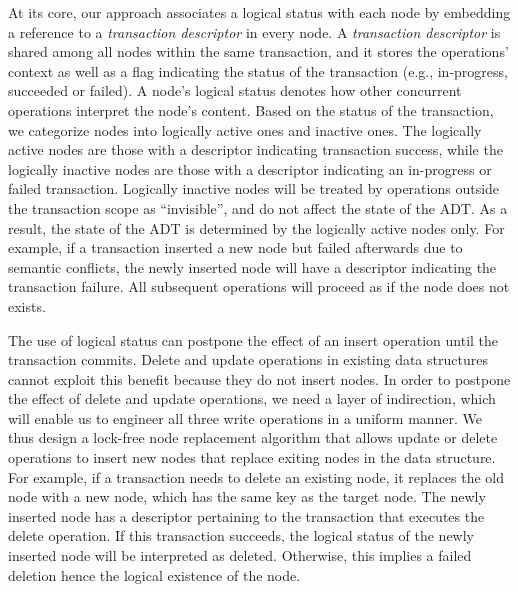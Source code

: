 \documentclass[10pt,conference,compsocconf]{IEEEtran}
\begin{document}
At its core, our approach associates a logical status with each node by embedding a reference to a \emph{transaction descriptor} in every node.
A \emph{transaction descriptor} is shared among all nodes within the same transaction, and it stores the operations' context as well as a flag indicating the status of the transaction (e.g., in-progress, succeeded or failed).
A node's logical status denotes how other concurrent operations interpret the node's content.
Based on the status of the transaction, we categorize nodes into logically active ones and inactive ones.
The logically active nodes are those with a descriptor indicating transaction success, while the logically inactive nodes are those with a descriptor indicating an in-progress or failed transaction.
Logically inactive nodes will be treated by operations outside the transaction scope as ``invisible'', and do not affect the state of the ADT. 
As a result, the state of the ADT is determined by the logically active nodes only.
For example, if a transaction inserted a new node but failed afterwards due to semantic conflicts, the newly inserted node will have a descriptor indicating the transaction failure.
All subsequent operations will proceed as if the node does not exists.

The use of logical status can postpone the effect of an insert operation until the transaction commits.
Delete and update operations in existing data structures cannot exploit this benefit because they do not insert nodes. 
In order to postpone the effect of delete and update operations, we need a layer of indirection, which will enable us to engineer all three write operations in a uniform manner.
We thus design a lock-free node replacement algorithm that allows update or delete operations to insert new nodes that replace exiting nodes in the data structure.
For example, if a transaction needs to delete an existing node, it replaces the old node with a new node, which has the same key as the target node. 
The newly inserted node has a descriptor pertaining to the transaction that executes the delete operation.
If this transaction succeeds, the logical status of the newly inserted node will be interpreted as deleted. 
Otherwise, this implies a failed deletion hence the logical existence of the node.
\end{document}
